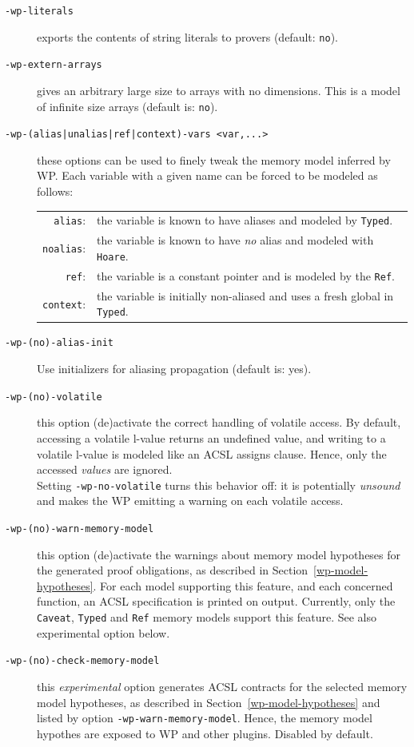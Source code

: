 \begin{description}
\item[\tt -wp-literals] exports the contents of string literals
  to provers (default: \texttt{no}).
\item[\tt -wp-extern-arrays] gives an arbitrary large size to arrays
  with no dimensions. This is a model of infinite size arrays
  (default is: \texttt{no}).
\item[\tt -wp-(alias|unalias|ref|context)-vars <var,...>] these options can be used
  to finely tweak the memory model inferred by \textsf{WP}. Each variable with a given name
  can be forced to be modeled as follows:\\[1ex]
  \begin{tabular}{rl}
      \texttt{alias}: & the variable is known to have aliases and modeled by \texttt{Typed}.\\
      \texttt{noalias}: & the variable is known to have \emph{no} alias and modeled with \texttt{Hoare}.\\
      \texttt{ref}: & the variable is a constant pointer and is modeled by the \texttt{Ref}.\\
      \texttt{context}: & the variable is initially non-aliased and uses a fresh global in \texttt{Typed}.\\
  \end{tabular}
\item[\tt -wp-(no)-alias-init] Use initializers for aliasing propagation (default is: yes).
\item[\tt -wp-(no)-volatile] this option (de)activate the correct handling of
  volatile access. By default, accessing a volatile l-value returns an undefined
  value, and writing to a volatile l-value is modeled like an \textsf{ACSL} assigns clause.
  Hence, only the accessed \emph{values} are ignored.\\
  Setting \texttt{-wp-no-volatile} turns this behavior off: it is potentially \emph{unsound} and
  makes the \textsf{WP} emitting a warning on each volatile access.
\item[\tt -wp-(no)-warn-memory-model] this option (de)activate the
  warnings about memory model hypotheses
  for the generated proof obligations, as described in Section~\ref{wp-model-hypotheses}.
  For each model supporting this feature, and each concerned function,
  an \textsf{ACSL} specification is printed on output.
  Currently, only the \texttt{Caveat}, \texttt{Typed} and \texttt{Ref} memory models support
  this feature. See also experimental option below.
\item[\tt -wp-(no)-check-memory-model] this \emph{experimental} option generates
  ACSL contracts for the selected memory model hypotheses, as described
  in Section~\ref{wp-model-hypotheses} and listed by option
  \texttt{-wp-warn-memory-model}.
  Hence, the memory model hypothes are exposed to \textsf{WP} and other plugins.
  Disabled by default.
\end{description}

